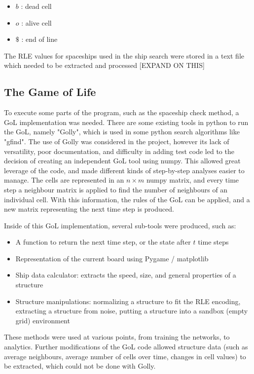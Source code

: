 \documentclass{l4proj}
\begin{document}
\begin{itemize}
    \item $b$ : dead cell
    \item $o$ : alive cell
    \item $\$$ : end of line
\end{itemize}

The RLE values for spaceships used in the ship search were stored in a text file which needed to be extracted and processed [EXPAND ON THIS]

\subsection{The Game of Life}

To execute some parts of the program, such as the spaceship check method, a GoL implementation was needed. There are some existing tools in python to run the GoL, namely "Golly", which is used in some python search algorithms like "gfind". The use of Golly was considered in the project, however its lack of versatility, poor documentation, and difficulty in adding test code led to the decision of creating an independent GoL tool using numpy. This allowed great leverage of the code, and made different kinds of step-by-step analyses easier to manage. The cells are represented in an $n \times m$ numpy matrix, and every time step a neighbour matrix is applied to find the number of neighbours of an individual cell. With this information, the rules of the GoL can be applied, and a new matrix representing the next time step is produced. 

Inside of this GoL implementation, several sub-tools were produced, such as:
\begin{itemize}
    \item A function to return the next time step, or the state after $t$ time steps 
    \item Representation of the current board using Pygame / matplotlib
    \item Ship data calculator: extracts the speed, size, and general properties of a structure
    \item Structure manipulations: normalizing a structure to fit the RLE encoding, extracting a structure from noise, putting a structure into a sandbox (empty grid) environment
\end{itemize}

These methods were used at various points, from training the networks, to analytics. Further modifications of the GoL code allowed structure data (such as average neighbours, average number of cells over time, changes in cell values) to be extracted, which could not be done with Golly. 
\end{document}
